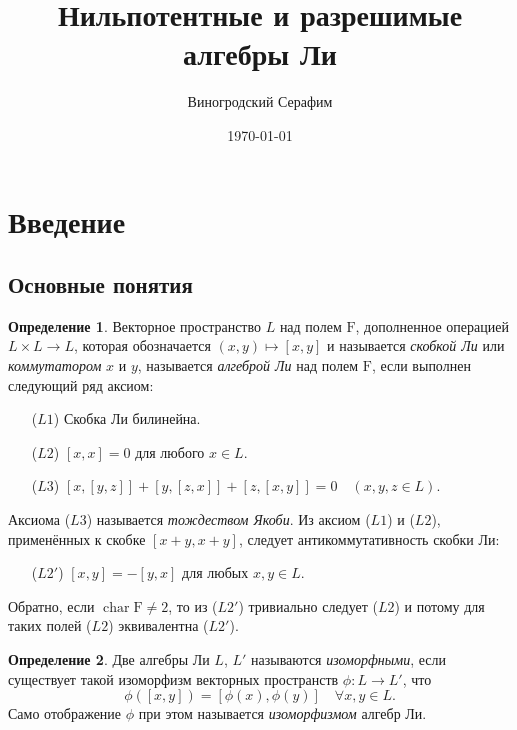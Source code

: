 \documentclass[a4paper, 12pt]{article}
\title{Нильпотентные и разрешимые алгебры Ли}
\author{Виногродский Серафим}
\date{\today}
\theoremstyle{definition}
\newtheorem{definition}{Определение}[section]
\begin{document}
\maketitle
\tableofcontents
\thispagestyle{empty}
\pagebreak

\section{Введение}%
\label{sec:introduction}

\subsection{Основные понятия}%
\label{sec:lie_algebra_notion}

\begin{definition}
    \label{def:lie_algebra}
    Векторное пространство \( L \) над полем \( \mathrm F \), дополненное операцией \( L \times L \to L \), которая обозначается \( (x ,y) \mapsto [x, y] \) и называется \textit{скобкой Ли} или \textit{коммутатором} \( x \) и \( y \), называется \textit{алгеброй Ли} над полем \( \mathrm F \), если выполнен следующий ряд аксиом:
\begin{itemize}
    \item[(\( L 1 \))] Скобка Ли билинейна.
    \item[(\( L 2 \))] \( [x, x] = 0 \) для любого \( x \in L \).
    \item[(\( L 3 \))] \( [x, [y, z]] + [y, [z, x]] + [z, [x, y]] = 0 \quad (x, y, z \in L) \).
\end{itemize}
\end{definition}

Аксиома (\( L 3 \)) называется \textit{тождеством Якоби}.
Из аксиом (\( L 1 \)) и (\( L 2 \)), применённых к скобке \( [x + y, x + y] \), следует антикоммутативность скобки Ли:
\begin{itemize}
    \item[(\( L 2' \))] \( [x, y] = -[y, x] \) для любых \( x, y \in L \).
\end{itemize}
Обратно, если \( \operatorname{char} \mathrm F \neq 2 \), то из (\( L 2' \)) тривиально следует (\( L 2 \)) и потому для таких полей (\( L 2 \)) эквивалентна (\( L 2' \)).

\begin{definition}
    \label{def:isomorphous_algebras}
    Две алгебры Ли \( L \), \( L' \) называются \textit{изоморфными}, если существует такой изоморфизм векторных пространств \( \phi : L \to L' \), что
    \[
        \phi([x, y]) = [\phi(x), \phi(y)] \quad \forall x, y \in L.
    \]
    Само отображение \( \phi \) при этом называется \textit{изоморфизмом} алгебр Ли.
\end{definition}
\end{document}
